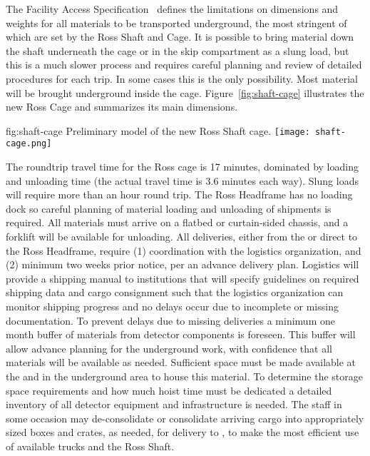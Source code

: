 The  Facility Access Specification~\cite{bib:docdb328} defines the limitations on dimensions and weights for all materials to be transported underground, the most stringent of which are set by the Ross Shaft and Cage.
It is possible to bring material down the shaft underneath the cage or in the skip compartment as a slung load, but this is a much slower process and requires careful planning and review of detailed procedures for each trip.
In some cases this is the only possibility.
Most material will be brought underground inside the cage.
Figure~\ref{fig:shaft-cage} illustrates the new Ross Cage and summarizes its main dimensions.
\begin{dunefigure}{fig:shaft-cage}
{Preliminary model of the new Ross Shaft cage.}
\texttt{[image: shaft-cage.png]}
\end{dunefigure}

The roundtrip travel time for the Ross cage is 17 minutes, dominated by loading and unloading time (the actual travel time is 3.6 minutes each way).
Slung loads will require more than an hour round trip.
The Ross Headframe has no loading dock so careful planning of material loading and unloading of shipments is required.
All materials must arrive on a flatbed or curtain-sided chassis, and a
forklift will be available for unloading.
All deliveries, either from the  or direct to the Ross Headframe, require (1) coordination with the  logistics organization, and (2) minimum two weeks prior notice, per an advance delivery plan.
Logistics will provide a shipping manual to  institutions that will specify guidelines on required shipping data and cargo consignment such that the logistics organization can monitor shipping progress and no delays occur due to incomplete or missing documentation.
To prevent delays due to missing deliveries a minimum one month buffer of materials from detector components is foreseen.
This buffer will allow advance planning for the underground work, with confidence that all materials will be available as needed.
Sufficient space must be made available at the  and in the underground area to house this material.
To determine the storage space requirements and how much hoist time must be dedicated a detailed inventory of all detector equipment and infrastructure is needed.
The  staff in some occasion may de-consolidate or consolidate arriving cargo into appropriately sized boxes and crates, as needed, for delivery to , to make the most efficient use of available trucks and the Ross Shaft.

